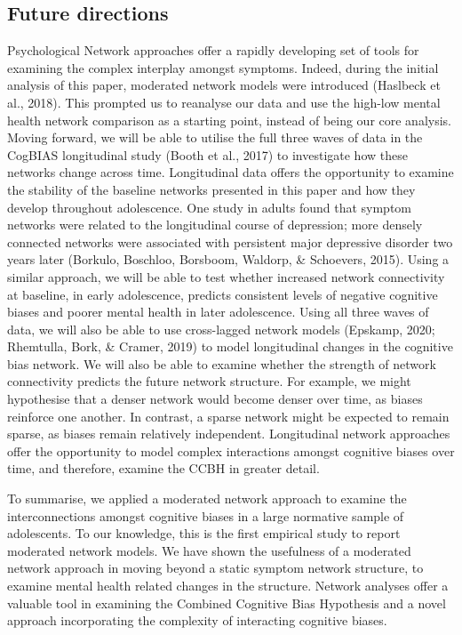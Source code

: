 \documentclass[
  english,
  man,floatsintext]{apa6}
\begin{document}
\hypertarget{future-directions}{%
\subsection{Future directions}\label{future-directions}}

Psychological Network approaches offer a rapidly developing set of tools for examining the complex interplay amongst symptoms. Indeed, during the initial analysis of this paper, moderated network models were introduced (Haslbeck et al., 2018). This prompted us to reanalyse our data and use the high-low mental health network comparison as a starting point, instead of being our core analysis. Moving forward, we will be able to utilise the full three waves of data in the CogBIAS longitudinal study (Booth et al., 2017) to investigate how these networks change across time. Longitudinal data offers the opportunity to examine the stability of the baseline networks presented in this paper and how they develop throughout adolescence. One study in adults found that symptom networks were related to the longitudinal course of depression; more densely connected networks were associated with persistent major depressive disorder two years later (Borkulo, Boschloo, Borsboom, Waldorp, \& Schoevers, 2015). Using a similar approach, we will be able to test whether increased network connectivity at baseline, in early adolescence, predicts consistent levels of negative cognitive biases and poorer mental health in later adolescence. Using all three waves of data, we will also be able to use cross-lagged network models (Epskamp, 2020; Rhemtulla, Bork, \& Cramer, 2019) to model longitudinal changes in the cognitive bias network. We will also be able to examine whether the strength of network connectivity predicts the future network structure. For example, we might hypothesise that a denser network would become denser over time, as biases reinforce one another. In contrast, a sparse network might be expected to remain sparse, as biases remain relatively independent. Longitudinal network approaches offer the opportunity to model complex interactions amongst cognitive biases over time, and therefore, examine the CCBH in greater detail.

To summarise, we applied a moderated network approach to examine the interconnections amongst cognitive biases in a large normative sample of adolescents. To our knowledge, this is the first empirical study to report moderated network models. We have shown the usefulness of a moderated network approach in moving beyond a static symptom network structure, to examine mental health related changes in the structure. Network analyses offer a valuable tool in examining the Combined Cognitive Bias Hypothesis and a novel approach incorporating the complexity of interacting cognitive biases.
\end{document}
